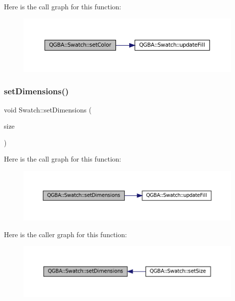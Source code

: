 Here is the call graph for this function\+:
\nopagebreak
\begin{figure}[H]
\begin{center}
\leavevmode
\includegraphics[width=350pt]{class_q_g_b_a_1_1_swatch_a15aa3d0793ab2ba0b8fba0dda9ec039a_cgraph}
\end{center}
\end{figure}
\mbox{\label{class_q_g_b_a_1_1_swatch_a13601b6763efa2a1858e1acb7d6289ad}} 
\subsubsection{\texorpdfstring{set\+Dimensions()}{setDimensions()}}
{\footnotesize\ttfamily void Swatch\+::set\+Dimensions (\begin{DoxyParamCaption}\item[{const Q\+Size \&}]{size }\end{DoxyParamCaption})}

Here is the call graph for this function\+:
\nopagebreak
\begin{figure}[H]
\begin{center}
\leavevmode
\includegraphics[width=350pt]{class_q_g_b_a_1_1_swatch_a13601b6763efa2a1858e1acb7d6289ad_cgraph}
\end{center}
\end{figure}
Here is the caller graph for this function\+:
\nopagebreak
\begin{figure}[H]
\begin{center}
\leavevmode
\includegraphics[width=350pt]{class_q_g_b_a_1_1_swatch_a13601b6763efa2a1858e1acb7d6289ad_icgraph}
\end{center}
\end{figure}
\mbox{\label{class_q_g_b_a_1_1_swatch_a2de15472f12d992a5462e188497453b2}} 
